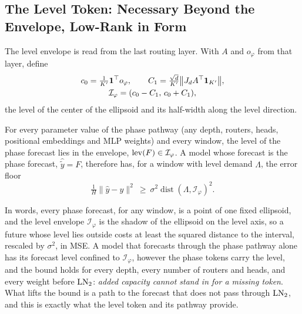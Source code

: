 {\subsection{The Level Token: Necessary Beyond the Envelope, Low-Rank in Form}
\label{sec:theory_level}

The level envelope is read from the last routing layer. With $A$ and $o_\varphi$ from that layer, define
\begin{equation}
\begin{gathered}
c_0=\tfrac{1}{K'}\mathbf 1^\top o_\varphi,\qquad
C_1=\tfrac{\sqrt d}{K'}\big\|J_dA^\top\mathbf 1_{K'}\big\|,\\
\mathcal I_\varphi=(c_0-C_1,\,c_0+C_1),
\end{gathered}
\label{eq:envelope_constants}
\end{equation}
the level of the center of the ellipsoid and its half-width along the level direction.

\begin{theorem}
\label{thm:level_envelope}
For every parameter value of the phase pathway (any depth, routers, heads, positional embeddings and MLP weights) and every window, the level of the phase forecast lies in the envelope, $\operatorname{lev}(F)\in\mathcal I_\varphi$. A model whose forecast is the phase forecast, $\hat{\tilde y}=F$, therefore has, for a window with level demand $\Lambda$, the error floor
\begin{equation}
\tfrac1H\|\hat y-y\|^2\ \ge\ \sigma^2\operatorname{dist}(\Lambda,\mathcal I_\varphi)^2 .
\label{eq:level_floor}
\end{equation}
\end{theorem}

In words, every phase forecast, for any window, is a point of one fixed ellipsoid, and the level envelope $\mathcal I_\varphi$ is the shadow of the ellipsoid on the level axis, so a future whose level lies outside costs at least the squared distance to the interval, rescaled by $\sigma^2$, in MSE. A model that forecasts through the phase pathway alone has its forecast level confined to $\mathcal I_\varphi$, however the phase tokens carry the level, and the bound holds for every depth, every number of routers and heads, and every weight before $\operatorname{LN}_2$: \emph{added capacity cannot stand in for a missing token}. What lifts the bound is a path to the forecast that does not pass through $\operatorname{LN}_2$, and this is exactly what the level token and its pathway provide.

}
